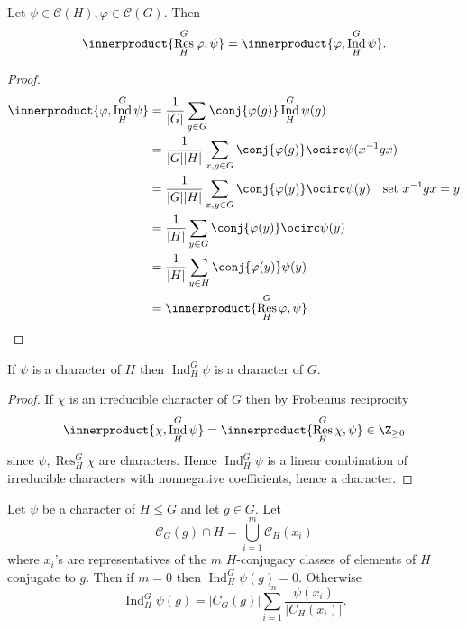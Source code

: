 \documentclass[a4paper]{article}
\newcommand*{\ip}{\innerproduct} %
\DeclareMathOperator{\Res}{Res} %
\DeclareMathOperator{\Ind}{Ind} %
\theoremstyle{definition}
\begin{document}
\begin{theorem}
  Let \(\psi \in \mathcal C(H), \varphi \in \mathcal C(G)\). Then
  \[
    \ip{\Res_H^G \varphi, \psi} = \ip{\varphi, \Ind_H^G \psi}.
  \]
\end{theorem}

\begin{proof}
  \begin{align*}
    \ip{\varphi, \Ind_H^G \psi}
    &= \frac{1}{|G|} \sum_{g \in G} \conj{\varphi(g)} \Ind_H^G \psi(g) \\
    &= \frac{1}{|G| |H|} \sum_{x, g \in G} \conj{\varphi(g)} \ocirc \psi(x^{-1}gx) \\
    &= \frac{1}{|G| |H|} \sum_{x, y \in G} \conj{\varphi(y)} \ocirc \psi(y) \quad \text{set } x^{-1}gx = y \\
    &= \frac{1}{|H|} \sum_{y \in G} \conj{\varphi(y)} \ocirc \psi(y) \\
    &= \frac{1}{|H|} \sum_{y \in H} \conj{\varphi(y)} \psi(y) \\
    &= \ip{\Res_H^G \varphi, \psi}
  \end{align*}
\end{proof}

\begin{corollary}
  If \(\psi\) is a character of \(H\) then \(\Ind_H^G \psi\) is a character of \(G\).
\end{corollary}

\begin{proof}
  If \(\chi\) is an irreducible character of \(G\) then by Frobenius reciprocity
  \[
    \ip{\chi, \Ind_H^G \psi} = \ip{\Res_H^G \chi, \psi} \in \Z_{\geq 0}
  \]
  since \(\psi, \Res_H^G \chi\) are characters. Hence \(\Ind_H^G \psi\) is a linear combination of irreducible characters with nonnegative coefficients, hence a character.
\end{proof}

\begin{proposition}
  Let \(\psi\) be a character of \(H \leq G\) and let \(g \in G\). Let
  \[
    \mathcal C_G(g) \cap H = \bigcup_{i = 1}^m \mathcal C_H(x_i)
  \]
  where \(x_i\)'s are representatives of the \(m\) \(H\)-conjugacy classes of elements of \(H\) conjugate to \(g\). Then if \(m = 0\) then \(\Ind_H^G \psi(g) = 0\). Otherwise
  \[
    \Ind_H^G \psi(g) = |C_G(g)| \sum_{i = 1}^m \frac{\psi(x_i)}{|C_H(x_i)|}.
  \]
\end{proposition}
\end{document}
